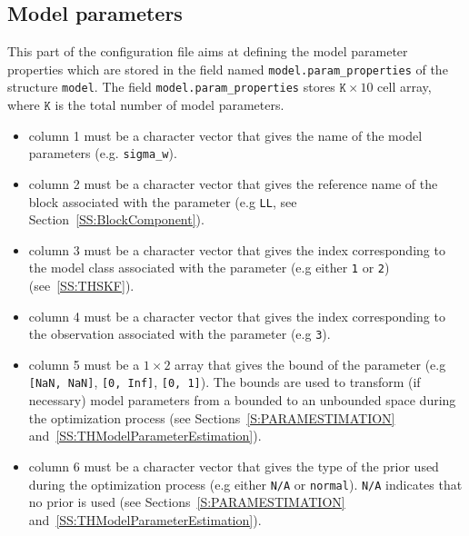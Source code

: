 \subsection{Model parameters}
\label{SS:ModelParamProperties}
This part of the configuration file aims at defining the model parameter properties which are stored in the field named \lstinline[basicstyle = \mlttfamily \small ]!model.param_properties! of the \MATLAB{} structure \lstinline[basicstyle = \mlttfamily \small ]!model!.
The field \lstinline[basicstyle = \mlttfamily \small ]!model.param_properties! stores $\mathtt{K} \times 10$ cell array, where $\mathtt{K}$ is the total number of model parameters.
\begin{itemize}
\item column 1 must be a character vector that gives the name of the model parameters (e.g.  \lstinline[basicstyle = \mlttfamily \small ]!sigma_w!). 
\item column 2 must be a character vector that gives the reference name of the block associated with the parameter (e.g \lstinline[basicstyle = \mlttfamily \small ]!LL!, see Section~\ref{SS:BlockComponent}).
\item column 3 must be a character vector that gives the index corresponding to the model class associated with the parameter (e.g  either \lstinline[basicstyle = \mlttfamily \small ]!1! or \lstinline[basicstyle = \mlttfamily \small ]!2!) (see~\ref{SS:THSKF}).
\item column 4 must be a character vector that gives the index corresponding to the observation associated with the parameter (e.g \lstinline[basicstyle = \mlttfamily \small ]!3!).
\item column 5 must be a $1\times2$ array that gives the bound of the parameter (e.g \lstinline[basicstyle = \mlttfamily \small ]![NaN, NaN]!,  \lstinline[basicstyle = \mlttfamily \small ]![0, Inf]!, \lstinline[basicstyle = \mlttfamily \small ]![0, 1]!). 
The bounds are used to transform (if necessary) model parameters from a bounded to  an unbounded space during the optimization process (see Sections~\ref{S:PARAMESTIMATION} and~\ref{SS:THModelParameterEstimation}).
\item column 6 must be a character vector that gives the type of the prior used during the optimization process (e.g  either \lstinline[basicstyle = \mlttfamily \small ]!N/A! or \lstinline[basicstyle = \mlttfamily \small ]!normal!). 
\lstinline[basicstyle = \mlttfamily \small ]!N/A! indicates that no prior is used (see Sections~\ref{S:PARAMESTIMATION} and~\ref{SS:THModelParameterEstimation}).

\end{itemize}
